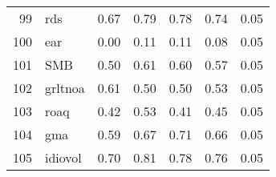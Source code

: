 \documentclass[12pt]{article}
\begin{document}
\begin{footnotesize}
\begin{longtable}{rl|c|c|c|c|c}
99  & rds              & 0.67                                                                                      & 0.79                                                                                        & 0.78                                                                                         & 0.74 & 0.05               \\
100 & ear              & 0.00                                                                                      & 0.11                                                                                        & 0.11                                                                                         & 0.08 & 0.05               \\
101 & SMB              & 0.50                                                                                      & 0.61                                                                                        & 0.60                                                                                         & 0.57 & 0.05               \\
102 & grltnoa          & 0.61                                                                                      & 0.50                                                                                        & 0.50                                                                                         & 0.53 & 0.05               \\
103 & roaq             & 0.42                                                                                      & 0.53                                                                                        & 0.41                                                                                         & 0.45 & 0.05               \\
104 & gma              & 0.59                                                                                      & 0.67                                                                                        & 0.71                                                                                         & 0.66 & 0.05               \\
105 & idiovol          & 0.70                                                                                      & 0.81                                                                                        & 0.78                                                                                         & 0.76 & 0.05               \\

\end{longtable}
\end{footnotesize}
\end{document}
